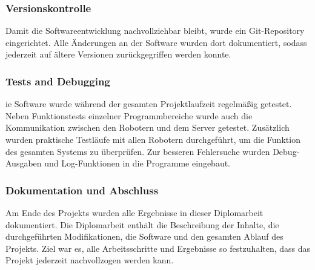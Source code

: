 \subsubsection{Versionskontrolle}
Damit die Softwareentwicklung nachvollziehbar bleibt, wurde ein Git-Repository eingerichtet.
Alle Änderungen an der Software wurden dort dokumentiert, sodass jederzeit auf ältere Versionen zurückgegriffen werden konnte.
\subsubsection{Tests and Debugging}
ie Software wurde während der gesamten Projektlaufzeit regelmäßig getestet.
Neben Funktionstests einzelner Programmbereiche wurde auch die Kommunikation zwischen den Robotern und dem Server getestet.
Zusätzlich wurden praktische Testläufe mit allen Robotern durchgeführt, um die Funktion des gesamten Systems zu überprüfen.
Zur besseren Fehlersuche wurden Debug-Ausgaben und Log-Funktionen in die Programme eingebaut.
\subsubsection{Dokumentation und Abschluss}
Am Ende des Projekts wurden alle Ergebnisse in dieser Diplomarbeit dokumentiert.
Die Diplomarbeit enthält die Beschreibung der Inhalte, die durchgeführten Modifikationen, die Software und den gesamten Ablauf des Projekts.
Ziel war es, alle Arbeitsschritte und Ergebnisse so festzuhalten, dass das Projekt jederzeit nachvollzogen werden kann.
